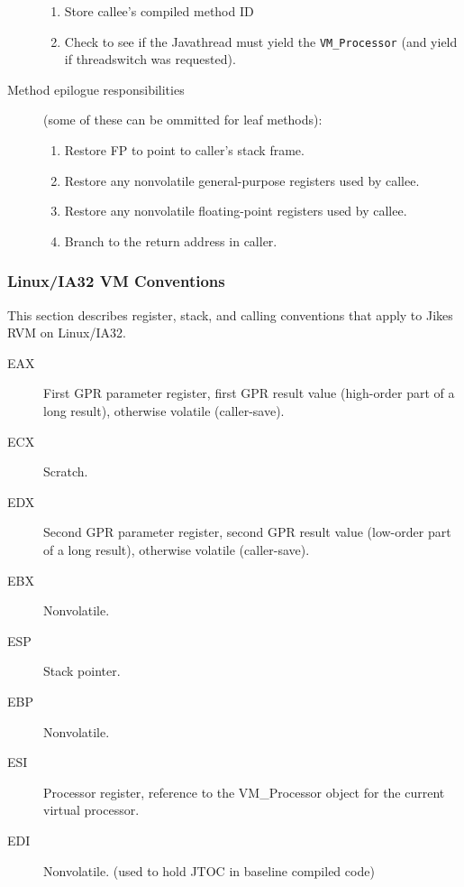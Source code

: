 \begin{description}
\begin{enumerate}
\item Store callee's compiled method ID 

\item Check to see if the Java\trademark thread must yield the {\tt VM\_Processor}
(and yield if threadswitch was requested). 
\end{enumerate}

\item [Method epilogue responsibilities] (some of these can be
ommitted for leaf methods):

\begin{enumerate}
\item Restore FP to point to caller's stack frame.

\item Restore any nonvolatile general-purpose registers used by callee.

\item Restore any nonvolatile floating-point registers used by callee.

\item Branch to the return address in caller.
\end{enumerate}
\end{description}

\subsubsection{Linux/IA32 VM Conventions} \label{lintel-conventions}

This section describes register, stack, and calling conventions that
apply to Jikes RVM on Linux/IA32.  


\begin{description}
\item [EAX]
    First GPR parameter register, first GPR result value (high-order part
    of a long result), otherwise volatile (caller-save).

\item[ECX]
    Scratch.

\item[EDX]
    Second GPR parameter register, second GPR result value (low-order part
    of a long result), otherwise volatile (caller-save).

\item[EBX]
    Nonvolatile.

\item[ESP]
    Stack pointer.

\item[EBP]
    Nonvolatile.

\item[ESI]
    Processor register, reference to the VM\_Processor object for the current
    virtual processor.

\item[EDI]
    Nonvolatile.  (used to hold JTOC in baseline compiled code)

\end{description}

